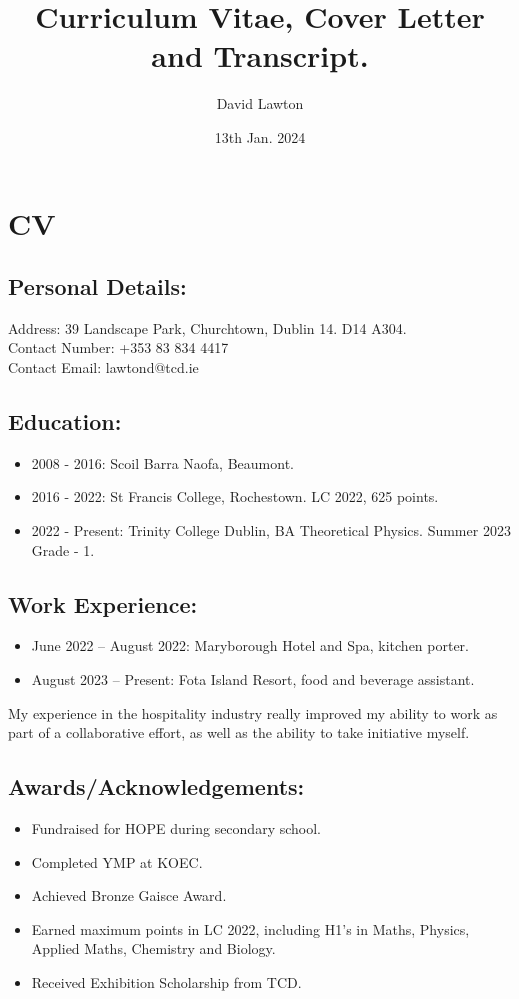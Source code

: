 \documentclass{article}
\title{Curriculum Vitae, Cover Letter and Transcript.}
\author{David Lawton}
\date{13th Jan. 2024}
\begin{document}
\maketitle

\section{CV}
\subsection{Personal Details:}
Address: 39 Landscape Park, Churchtown, Dublin 14. D14 A304.\\
Contact Number: +353 83 834 4417\\
Contact Email: lawtond@tcd.ie\\

\subsection{Education:}
\begin{itemize}
\item 2008 - 2016: Scoil Barra Naofa, Beaumont.
\item 2016 - 2022: St Francis College, Rochestown. LC 2022, 625 points.
\item 2022 - Present: Trinity College Dublin, BA Theoretical Physics. Summer 2023 Grade - 1.
\end{itemize}
\subsection{Work Experience:}
\begin{itemize}
\item June 2022 – August 2022: Maryborough Hotel and Spa, kitchen porter. 
\item August 2023 – Present: Fota Island Resort, food and beverage assistant.
\end{itemize}
My experience in the hospitality industry really improved my ability to work as part of a collaborative effort, as well as the ability to take initiative myself.
\subsection{Awards/Acknowledgements:}
\begin{itemize}
\item Fundraised for HOPE during secondary school.
\item Completed YMP at KOEC.
\item Achieved Bronze Gaisce Award.
\item Earned maximum points in LC 2022, including H1's in Maths, Physics, Applied Maths, Chemistry and Biology.
\item Received Exhibition Scholarship from TCD.
\end{itemize}
\end{document}
